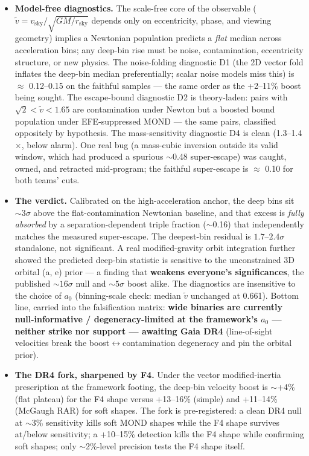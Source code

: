 \documentclass[11pt,a4paper]{article}
\begin{document}
\begin{itemize}
\item \textbf{Model-free diagnostics.} The scale-free core of the observable ($\tilde v = v_{\mathrm{sky}}/\sqrt{GM/r_{\mathrm{sky}}}$ depends only on eccentricity, phase, and viewing geometry) implies a Newtonian population predicts a \emph{flat} median across acceleration bins; any deep-bin rise must be noise, contamination, eccentricity structure, or new physics. The noise-folding diagnostic D1 (the 2D vector fold inflates the deep-bin median preferentially; scalar noise models miss this) is $\approx$ 0.12--0.15 on the faithful samples --- the same order as the +2--11\% boost being sought. The escape-bound diagnostic D2 is theory-laden: pairs with $\sqrt{2} < \tilde v < 1.65$ are contamination under Newton but a boosted bound population under EFE-suppressed MOND --- the same pairs, classified oppositely by hypothesis. The mass-sensitivity diagnostic D4 is clean (1.3--1.4$\times$, below alarm). One real bug (a mass-cubic inversion outside its valid window, which had produced a spurious $\sim$0.48 super-escape) was caught, owned, and retracted mid-program; the faithful super-escape is $\approx$ 0.10 for both teams' cuts.

\item \textbf{The verdict.} Calibrated on the high-acceleration anchor, the deep bins sit $\sim{}3\sigma$ above the flat-contamination Newtonian baseline, and that excess is \emph{fully absorbed} by a separation-dependent triple fraction ($\sim$0.16) that independently matches the measured super-escape. The deepest-bin residual is $1.7$--$2.4\sigma$ standalone, not significant. A real modified-gravity orbit integration further showed the predicted deep-bin statistic is sensitive to the unconstrained 3D orbital (a, e) prior --- a finding that \textbf{weakens everyone's significances}, the published $\sim{}16\sigma$ null and $\sim{}5\sigma$ boost alike. The diagnostics are insensitive to the choice of $a_{0}$ (binning-scale check: median $\tilde v$ unchanged at 0.661). Bottom line, carried into the falsification matrix: \textbf{wide binaries are currently null-informative / degeneracy-limited at the framework's $a_{0}$ --- neither strike nor support --- awaiting Gaia DR4} (line-of-sight velocities break the boost$\leftrightarrow$contamination degeneracy and pin the orbital prior).

\item \textbf{The DR4 fork, sharpened by F4.} Under the vector modified-inertia prescription at the framework footing, the deep-bin velocity boost is $\sim$+4\% (flat plateau) for the F4 shape versus +13--16\% (simple) and +11--14\% (McGaugh RAR) for soft shapes. The fork is pre-registered: a clean DR4 null at $\sim$3\% sensitivity kills soft MOND shapes while the F4 shape survives at/below sensitivity; a +10--15\% detection kills the F4 shape while confirming soft shapes; only $\sim$2\%-level precision tests the F4 shape itself.

\end{itemize}
\end{document}
